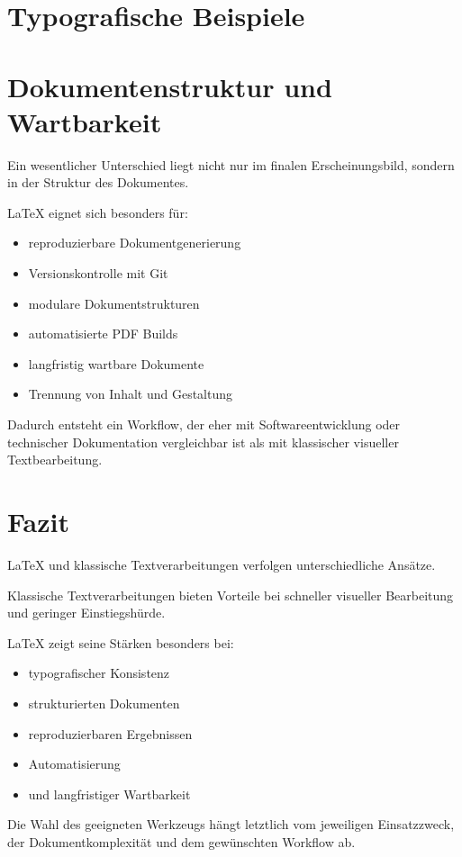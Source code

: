 \documentclass[11pt,a4paper]{article}
\begin{document}
\section*{Typografische Beispiele}

\section*{Dokumentenstruktur und Wartbarkeit}

Ein wesentlicher Unterschied liegt nicht nur im finalen Erscheinungsbild, sondern in der Struktur des Dokumentes.

LaTeX eignet sich besonders für:

\begin{itemize}
\item reproduzierbare Dokumentgenerierung
\item Versionskontrolle mit Git
\item modulare Dokumentstrukturen
\item automatisierte PDF Builds
\item langfristig wartbare Dokumente
\item Trennung von Inhalt und Gestaltung
\end{itemize}

Dadurch entsteht ein Workflow, der eher mit Softwareentwicklung oder technischer Dokumentation vergleichbar ist als mit klassischer visueller Textbearbeitung.

\section*{Fazit}

LaTeX und klassische Textverarbeitungen verfolgen unterschiedliche Ansätze.

Klassische Textverarbeitungen bieten Vorteile bei schneller visueller Bearbeitung und geringer Einstiegshürde.

LaTeX zeigt seine Stärken besonders bei:

\begin{itemize}
\item typografischer Konsistenz
\item strukturierten Dokumenten
\item reproduzierbaren Ergebnissen
\item Automatisierung
\item und langfristiger Wartbarkeit
\end{itemize}

Die Wahl des geeigneten Werkzeugs hängt letztlich vom jeweiligen Einsatzzweck, der Dokumentkomplexität und dem gewünschten Workflow ab.
\end{document}

